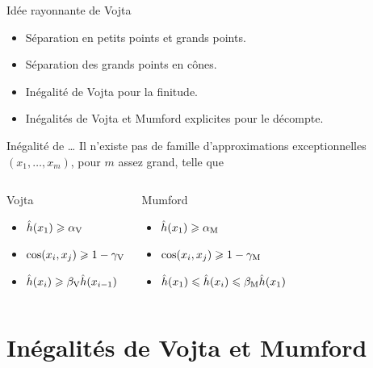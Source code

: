\documentclass{mpg-thslides}
\begin{document}
\begin{frame}{Idée rayonnante de Vojta}
  \begin{itemize}
    \item Séparation en petits points et grands points.
    \item Séparation des grands points en cônes.
    \item Inégalité de Vojta pour la finitude.
    \item Inégalités de Vojta et Mumford explicites pour le décompte.
  \end{itemize}
  \begin{block}{Inégalité de \dots}
    Il n'existe pas de famille d'approximations exceptionnelles \( (x_1,
      \dots, x_m) \), pour \( m \) assez grand, telle que
    \begin{columns}
      \begin{block}{Vojta}
        \begin{itemize}
          \item \( \hat h (x_1) \geqslant \alpha \sb{\mathrm{V}} \)
          \item \( \cos(x_i, x_j) \geqslant 1 - \gamma \sb{\mathrm{V}} \)
          \item \( \hat h (x_i) \geqslant \beta \sb{\mathrm{V}} \hat h (x_{i-1}) \)
        \end{itemize}
      \end{block}
      \begin{block}{Mumford}
        \begin{itemize}
          \item \( \hat h (x_1) \geqslant \alpha \sb{\mathrm{M}} \)
          \item \( \cos(x_i, x_j) \geqslant 1 - \gamma \sb{\mathrm{M}} \)
          \item \( \hat h (x_1) \leqslant \hat h (x_i) \leqslant \beta \sb{\mathrm{M}} \hat h (x_1) \)
        \end{itemize}
      \end{block}
    \end{columns}
  \end{block}
\end{frame}



\section[Inégalités]{Inégalités de Vojta et Mumford}
\tocsect
\end{document}
